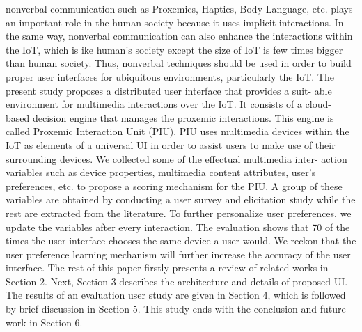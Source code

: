 \documentclass[runningheads,a4paper]{llncs}
\begin{document}
nonverbal communication such as Proxemics, Haptics, Body Language, etc. plays an important role in the human society because it uses implicit interactions. In the same way, nonverbal communication can also enhance the interactions within the IoT, which is ike human’s society except the size of IoT is few times bigger than human society. Thus, nonverbal techniques should be used in order to build proper user interfaces for ubiquitous environments, particularly the IoT. 
\newline
\newline
The present study proposes a distributed user interface that provides a suit- able environment for multimedia interactions over the IoT. It consists of a cloud- based decision engine that manages the proxemic interactions. This engine is called Proxemic Interaction Unit (PIU). PIU uses multimedia devices within the IoT as elements of a universal UI in order to assist users to make use of their surrounding devices. We collected some of the effectual multimedia inter- action variables such as device properties, multimedia content attributes, user’s preferences, etc. to propose a scoring mechanism for the PIU. A group of these variables are obtained by conducting a user survey and elicitation study while the rest are extracted from the literature. To further personalize user preferences, we update the variables after every interaction. The evaluation shows that 70  of the times the user interface chooses the same device a user would. We reckon that the user preference learning mechanism will further increase the accuracy of the user interface. 
\newline
The rest of this paper firstly presents a review of related works in Section 2. Next, Section 3 describes the architecture and details of proposed UI. The results of an evaluation user study are given in Section 4, which is followed by brief discussion in Section 5. This study ends with the conclusion and future work in Section 6. 
\end{document}
